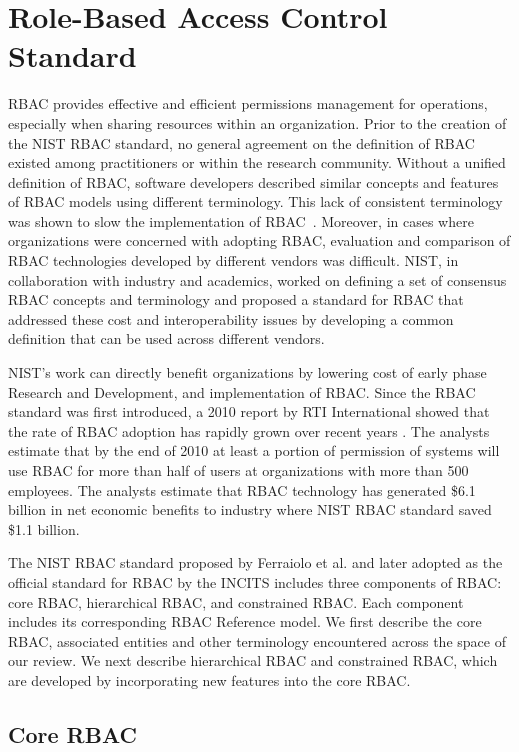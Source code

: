 \section{Role-Based Access Control Standard} \label{sec:core-rbac}

RBAC provides effective and efficient permissions management for operations, especially when sharing resources within an organization.
Prior to the creation of the NIST RBAC standard, no general agreement on the definition 
of RBAC existed among practitioners or within the research community. 
Without a unified definition of RBAC, software developers described similar concepts and features of RBAC models using different terminology. 
This lack of consistent terminology was shown to slow the implementation of RBAC~\cite{o20102010}.  
Moreover, in cases where organizations were concerned with adopting RBAC,
evaluation and comparison of RBAC technologies developed by different vendors was difficult.
NIST, in collaboration with industry and academics, worked on defining a set of consensus RBAC concepts and terminology and proposed a standard for 
RBAC that addressed these cost and interoperability issues by developing a common definition that can be used across different vendors.

NIST's work can directly benefit organizations by lowering cost of early phase Research and Development, and implementation of RBAC.
Since the RBAC standard was first introduced, a 2010 report by RTI International showed that the rate of RBAC adoption has rapidly grown over recent years \cite{o20102010}. 
The analysts estimate that by the end of 2010 at least a portion of permission of systems will use RBAC for more than half of users at organizations with more than 500 employees. The analysts estimate that RBAC technology has generated \$6.1 billion in net economic benefits to industry where NIST RBAC standard saved \$1.1 billion.

The NIST RBAC standard proposed by Ferraiolo et al. \cite{ferraiolo} and later adopted as the official standard for RBAC by the INCITS includes three components of RBAC: core RBAC, hierarchical RBAC, and constrained RBAC. Each component includes its corresponding RBAC Reference model. We first describe the core RBAC, associated entities and other terminology encountered across the space of our review. We next describe hierarchical RBAC and constrained RBAC, which are developed by incorporating new features into the core RBAC. 

\subsection{Core RBAC} 

